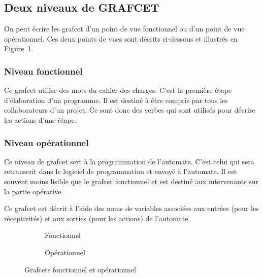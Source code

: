 \subsection{Deux niveaux de GRAFCET}
On peut écrire les grafcet d'un point de vue fonctionnel ou d'un point de vue opérationnel. Ces deux points de vues sont décrits ci-dessous et illustrés en Figure~\ref{fig:fonctionnelVsOperationnel}.
\subsubsection{Niveau fonctionnel}
Ce grafcet utilise des mots du cahier des charges. C'est la première étape d'élaboration d'un programme. Il est destiné à être compris par tous les collaborateurs d'un projet. Ce sont donc des verbes qui sont utilisés pour décrire les actions d'une étape.
\subsubsection{Niveau opérationnel}
Ce niveau de grafcet sert à la programmation de l'automate. C'est celui qui sera retranscrit dans le logiciel de programmation et envoyé à l'automate. Il est souvent moins lisible que le grafcet fonctionnel et est destiné aux intervenants sur la partie opérative.

Ce grafcet est décrit à l'aide des noms de variables associées aux entrées (pour les réceptivités) et aux sorties (pour les actions) de l'automate.


\begin{figure}
  \centering
  \begin{subfigure}[b]{.48\textwidth}
    
    \caption{Fonctionnel}
  \end{subfigure}
  \begin{subfigure}[b]{.48\textwidth}
    
    \caption{Opérationnel}
  \end{subfigure}
  \caption{Grafcets fonctionnel et opérationnel}
  \label{fig:fonctionnelVsOperationnel}
\end{figure}
